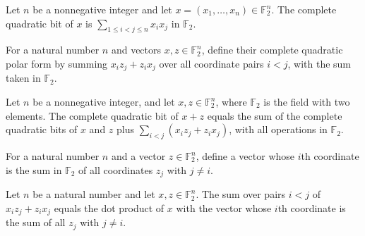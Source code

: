 \begin{definition}
\label{FABL.completeQuadraticBit}
\leanok
{}
Let $n$ be a nonnegative integer and let $x=(x_1,\ldots,x_n)\in\mathbb F_2^n$. The
complete quadratic bit of $x$ is $\sum_{1\le i<j\le n}x_i x_j$ in $\mathbb F_2$.
\end{definition}

\begin{definition}
\label{FABL.completeQuadraticPolar}
\leanok
{}
For a natural number $n$ and vectors $x,z\in\mathbb{F}_2^n$, define their complete
quadratic polar form by summing $x_i z_j+z_i x_j$ over all coordinate pairs $i<j$, with
the sum taken in $\mathbb{F}_2$.
\end{definition}

\begin{theorem}
\label{FABL.completeQuadraticBit_add}
\leanok
{}
Let $n$ be a nonnegative integer, and let $x,z\in\mathbb{F}_2^n$, where $\mathbb{F}_2$
is the field with two elements. The complete quadratic bit of $x+z$ equals the sum of
the complete quadratic bits of $x$ and $z$ plus $\sum_{i<j}(x_i z_j+z_i x_j)$, with all
operations in $\mathbb{F}_2$.
\end{theorem}

\begin{definition}
\label{FABL.completeQuadraticPolarFrequency}
\leanok
For a natural number $n$ and a vector $z\in\mathbb{F}_2^n$, define a vector whose $i$th
coordinate is the sum in $\mathbb{F}_2$ of all coordinates $z_j$ with $j\ne i$.
\end{definition}

\begin{theorem}
\label{FABL.completeQuadraticPolar_eq_dotProduct}
\leanok
{}
Let $n$ be a natural number and let $x,z\in\mathbb F_2^n$. The sum over pairs $i<j$ of
$x_i z_j+z_i x_j$ equals the dot product of $x$ with the vector whose $i$th coordinate
is the sum of all $z_j$ with $j\ne i$.
\end{theorem}

